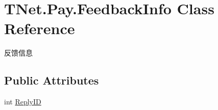\hypertarget{class_t_net_1_1_pay_1_1_feedback_info}{}\section{T\+Net.\+Pay.\+Feedback\+Info Class Reference}
\label{class_t_net_1_1_pay_1_1_feedback_info}


反馈信息  


\subsection*{Public Attributes}
\begin{DoxyCompactItemize}
\item 
int \mbox{\hyperlink{class_t_net_1_1_pay_1_1_feedback_info_a70c546f7e358fa80a35c51c165cc0ea2}{Reply\+ID}}
\end{DoxyCompactItemize}
